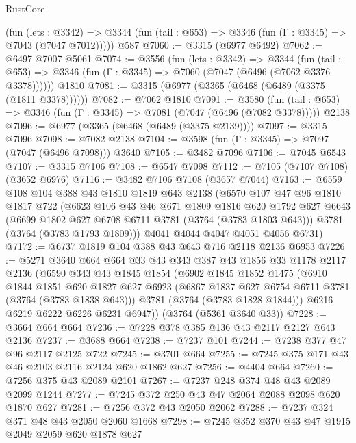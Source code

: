 \begin{lexlean}{RustCore}
\begin{coremodule}
      (fun (lets : @3342) =>
      @3344 (fun (tail : @653) => @3346 (fun (Γ : @3345) => @7043 (@7047 @7012)))))
    @587
@7060 := @3315 (@6977 @6492)
@7062 := @6497 @7007 @5061
@7074 := @3556
    (fun (lets : @3342) =>
    @3344
      (fun (tail : @653) => @3346 (fun (Γ : @3345) => @7060 (@7047 (@6496 (@7062 @3376 @3378))))))
    @1810
@7081 := @3315 (@6977 (@3365 (@6468 (@6489 (@3375 (@1811 @3378))))))
@7082 := @7062 @1810
@7091 := @3580
    (fun (tail : @653) => @3346 (fun (Γ : @3345) => @7081 (@7047 (@6496 (@7082 @3378)))))
    @2138
@7096 := @6977 (@3365 (@6468 (@6489 (@3375 @2139))))
@7097 := @3315 @7096
@7098 := @7082 @2138
@7104 := @3598 (fun (Γ : @3345) => @7097 (@7047 (@6496 @7098))) @3640
@7105 := @3482 @7096
@7106 := @7045 @6543
@7107 := @3315 @7106
@7108 := @6547 @7098
@7112 := @7105 (@7107 @7108) (@3652 @6976)
@7116 := @3482 @7106 @7108 (@3657 @7044)
@7163 := @6559
    @108
    @104
    @388
    @43
    @1810
    @1819
    @643
    @2138
    (@6570
      @107
      @47
      @96
      @1810
      @1817
      @722
      (@6623
        @106
        @43
        @46
        @671
        @1809
        @1816
        @620
        @1792
        @627
        @6643
        (@6699 @1802 @627 @6708 @6711 @3781 (@3764 (@3783 @1803 @643)))
        @3781
        (@3764 (@3783 @1793 @1809)))
      @4041
      @4044
      @4047
      @4051
      @4056
      @6731)
@7172 := @6737 @1819 @104 @388 @43 @643 @716 @2118 @2136 @6953
@7226 := @5271
    @3640
    @664
    @664
    @33
    @43
    @343
    @387
    @43
    @1856
    @33
    @1178
    @2117
    @2136
    (@6590
      @343
      @43
      @1845
      @1854
      (@6902
        @1845
        @1852
        @1475
        (@6910
          @1844
          @1851
          @620
          @1827
          @627
          @6923
          (@6867 @1837 @627 @6754 @6711 @3781 (@3764 (@3783 @1838 @643)))
          @3781
          (@3764 (@3783 @1828 @1844)))
        @6216
        @6219
        @6222
        @6226
        @6231
        @6947))
    (@3764 (@5361 @3640 @33))
@7228 := @3664 @664 @664
@7236 := @7228 @378 @385 @136 @43 @2117 @2127 @643 @2136
@7237 := @3688 @664
@7238 := @7237 @101
@7244 := @7238 @377 @47 @96 @2117 @2125 @722
@7245 := @3701 @664
@7255 := @7245 @375 @171 @43 @46 @2103 @2116 @2124 @620 @1862 @627
@7256 := @4404 @664
@7260 := @7256 @375 @43 @2089 @2101
@7267 := @7237 @248 @374 @48 @43 @2089 @2099 @1244
@7277 := @7245 @372 @250 @43 @47 @2064 @2088 @2098 @620 @1870 @627
@7281 := @7256 @372 @43 @2050 @2062
@7288 := @7237 @324 @371 @48 @43 @2050 @2060 @1668
@7298 := @7245 @352 @370 @43 @47 @1915 @2049 @2059 @620 @1878 @627

\end{coremodule}
\end{lexlean}
